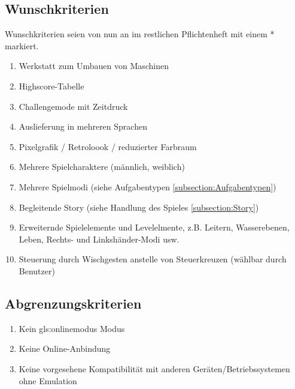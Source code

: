 \documentclass{scrartcl}
\begin{document}
\subsection{Wunschkriterien}
Wunschkriterien seien von nun an im restlichen Pflichtenheft mit einem * markiert.

\begin{enumerate}
	\item \label{wunsch:werkstatt}Werkstatt zum Umbauen von Maschinen
	\item \label{wunsch:highscore}Highscore-Tabelle
	\item \label{wunsch:challengemode}Challengemode mit Zeitdruck
	\item \label{wunsch:multilang}Auslieferung in mehreren Sprachen
	\item \label{wunsch:8bit}Pixelgrafik / Retroloook / reduzierter Farbraum
	\item \label{wunsch:multiplechar}Mehrere Spielcharaktere (männlich, weiblich)
	\item \label{wunsch:multiplemode}Mehrere Spielmodi (siehe Aufgabentypen \ref{subsection:Aufgabentypen})
    \item \label{wunsch:story}Begleitende Story (siehe Handlung des Spieles \ref{subsection:Story})
    \item \label{wunsch:erweiterndeLevelelemente}Erweiternde Spielelemente und Levelelmente, z.B. Leitern, Wasserebenen, Leben, Rechts- und Linkshänder-Modi usw.
    \item \label{wunsch:wischgesten} Steuerung durch Wischgesten anstelle von Steuerkreuzen (wählbar durch Benutzer)
\end{enumerate}

\subsection{Abgrenzungskriterien}

\begin{enumerate}
	\item \label{abgrenz:online}Kein \gls{gls:onlinemodus} Modus
	\item \label{abgrenz:multiplayer}Keine Online-Anbindung
	\item \label{abgrenz:emu}Keine vorgesehene Kompatibilität mit anderen Geräten/Betriebssystemen ohne Emulation
\end{enumerate}

\clearpage
\end{document}
